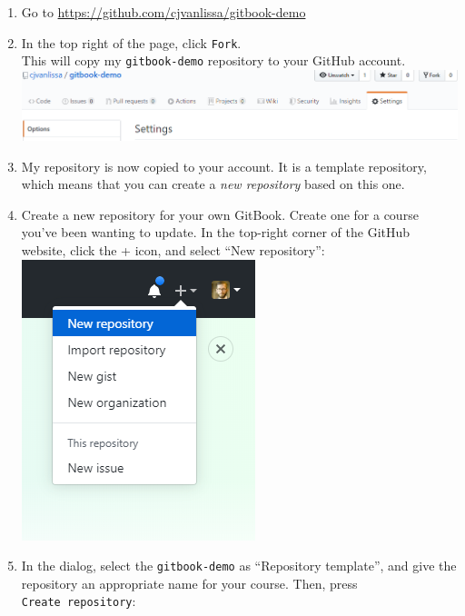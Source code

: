 \documentclass[
]{book}
\providecommand{\tightlist}{%
  \setlength{\itemsep}{0pt}\setlength{\parskip}{0pt}}
\begin{document}
\begin{enumerate}
\def\labelenumi{\arabic{enumi}.}
\tightlist
\item
  Go to \url{https://github.com/cjvanlissa/gitbook-demo}
\item
  In the top right of the page, click \texttt{Fork}.\\
  This will copy my \texttt{gitbook-demo} repository to your GitHub account.\\
  \includegraphics{./img/settings.png}
\item
  My repository is now copied to your account. It is a template repository, which means that you can create a \emph{new repository} based on this one.
\item
  Create a new repository for your own GitBook. Create one for a course you've been wanting to update. In the top-right corner of the GitHub website, click the + icon, and select ``New repository'':\\
  \includegraphics{./img/new_repo.png}
\item
  In the dialog, select the \texttt{gitbook-demo} as ``Repository template'', and give the repository an appropriate name for your course. Then, press \texttt{Create\ repository}:\\

\end{enumerate}
\end{document}
